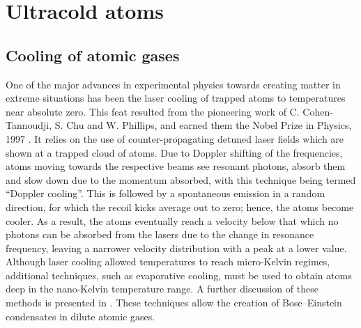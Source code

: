 \section{Ultracold atoms}\label{sec:coldatoms}
\subsection{Cooling of atomic gases}\label{sub:cooling}
One of the major advances in experimental physics towards creating matter in extreme situations has been the laser cooling of trapped atoms to temperatures near absolute zero. This feat resulted from the pioneering work of C. Cohen-Tannoudji, S. Chu and W.
Phillips, and earned them the Nobel Prize in Physics, 1997 \cite{AO:Chu_revmod_1998,AO:Cohen_revmod_1998,AO:Phillips_revmod_1998}.
It relies on the use of counter-propagating detuned laser fields which are shown at a trapped cloud of atoms. Due to Doppler shifting of the frequencies, atoms moving towards the respective beams see resonant photons, absorb them and slow down due to the momentum absorbed, with this technique being termed ``Doppler cooling''. This is followed by a spontaneous emission in a random direction, for which the recoil kicks average out to zero; hence, the atoms become cooler. As a result, the atoms eventually reach a velocity below that which no photons can be absorbed from the lasers due to the change in resonance frequency, leaving a narrower velocity distribution with a peak at a lower value. Although laser cooling allowed temperatures to reach micro-Kelvin regimes, additional techniques, such as evaporative cooling, must be used to obtain atoms deep in the nano-Kelvin temperature range. A further discussion of these methods is presented in \cite{BK:Foot_2005,BK:Metcalf_1999}. These techniques allow the creation of Bose--Einstein condensates in dilute atomic gases.

